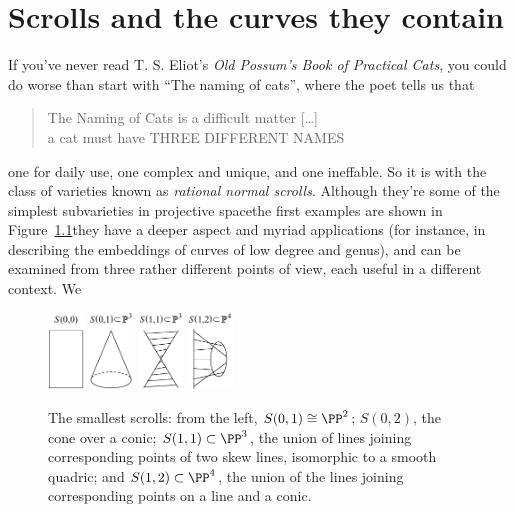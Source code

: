 
\chapter{Scrolls and the curves they contain}
\label{ScrollsChapter}

If you've never read T. S. Eliot's {\it Old Possum's Book of Practical Cats}, 
you could do worse than start with ``The naming of cats'',
where the poet tells us that
\begin{quote}%
The Naming of Cats is a difficult matter [\dots]\\
a cat must have THREE DIFFERENT NAMES
\end{quote}%

\noindent %
\emdash one for daily use, one complex and unique, and one ineffable.
So it is with the class of varieties
%
%
%
known as \emph{rational normal scrolls}. Although they're some of the
%
simplest subvarieties in projective space\emdash the first examples
are shown in Figure~\ref{Fig16.1}\emdash they have a deeper aspect and
myriad applications (for instance, in describing the embeddings of
curves of low degree and genus), and can be examined from three rather
different points of view, each useful in a different context. We
%
\begin{figure}[h]
\includegraphics[height=0.8in,trim=0 0 0 15,clip]{main/Fig16-1A}\qquad
\includegraphics[height=0.8in,trim=0 0 0 15,clip]{main/Fig16-1B}\qquad
\includegraphics[height=0.8in,trim=0 0 0 15,clip]{main/Fig16-1C}\qquad
\includegraphics[height=0.8in,trim=0 0 0 15,clip]{main/Fig16-1D-new}%
\caption{The smallest scrolls: from the left, $S(0,1) \cong \PP^{2}$;
$S(0,2)$, the cone over a conic; $S(1,1)\subset \PP^{3}$, the union of
lines joining corresponding points of two skew lines, isomorphic to a
%
smooth quadric; and $S(1,2)\subset \PP^{4}$, the union of the lines
joining corresponding points on a line and a conic.
\vspace*{-10pt}
}
\label{Fig16.1}
\end{figure}
